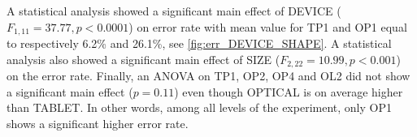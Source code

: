 \documentclass{chi-ext}
\newcommand{\cdt}[1]{{\small\uppercase{{#1}}}}
\begin{document}
A statistical analysis showed a significant main effect of DEVICE ($F_{1,11} = 37.77, p < 0.0001$) on error rate with mean value for \cdt{TP1} and \cdt{OP1} equal to respectively 6.2\% and 26.1\%, see \autoref{fig:err_DEVICE_SHAPE}. A statistical analysis also showed a significant main effect of \cdt{SIZE} ($F_{2,22} = 10.99, p < 0.001$) on the error rate. Finally, an ANOVA on \cdt{TP1}, \cdt{OP2}, \cdt{OP4} and \cdt{OL2} did not show a significant main effect ($p = 0.11$) even though \cdt{OPTICAL} is on average higher than \cdt{TABLET}. In other words, among all levels of the experiment, only \cdt{OP1} shows a significant higher error rate.

\end{document}
